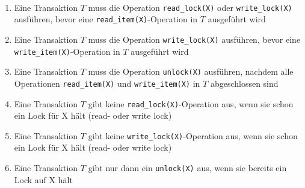 \begin{frame}{\insertsection}
	\framesubtitle{\insertsubsection}
\begin{enumerate}
\item Eine Transaktion $T$ muss die Operation \texttt{read\_lock(X)} oder \texttt{write\_lock(X)} ausführen, bevor eine \texttt{read\_item(X)}-Operation in $T$ ausgeführt wird
\item Eine Transaktion $T$ muss die Operation \texttt{write\_lock(X)} ausführen, bevor eine \texttt{write\_item(X)}-Operation in $T$ ausgeführt wird
\item Eine Transaktion $T$ muss die Operation \texttt{unlock(X)} ausführen, nachdem alle Operationen \texttt{read\_item(X)} und \texttt{write\_item(X)} in $T$ abgeschlossen sind
\item Eine Transaktion $T$ gibt keine \texttt{read\_lock(X)}-Operation aus, wenn sie schon ein Lock für X hält (read- oder write lock)
\item Eine Transaktion $T$ gibt keine \texttt{write\_lock(X)}-Operation aus, wenn sie schon ein Lock für X hält (read- oder write lock)
\item Eine Transaktion $T$ gibt nur dann ein \texttt{unlock(X)} aus, wenn sie bereits ein Lock auf X hält
\end{enumerate}
\end{frame}

